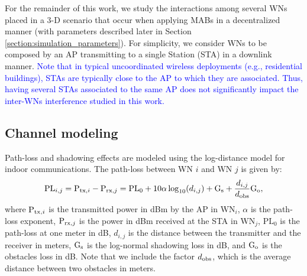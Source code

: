 \documentclass[preprint,12pt]{elsarticle}
\begin{document}
	For the remainder of this work, we study the interactions among several WNs placed in a 3-D scenario that occur when applying MABs in a decentralized manner (with parameters described later in Section \ref{section:simulation_parameters}). For simplicity, we consider WNs to be composed by an AP transmitting to a single Station (STA) in a downlink manner. \textcolor{blue}{Note that in typical uncoordinated wireless deployments (e.g., residential buildings), STAs are typically close to the AP to which they are associated. Thus, having several STAs associated to the same AP does not significantly impact the inter-WNs interference \textcolor{blue}{studied} in this work.}
	
	\subsection{Channel modeling}
	\label{section:channel_modelling}		
	Path-loss and shadowing effects are modeled using the log-distance model for indoor communications. The path-loss between WN $i$ and WN $j$ is given by:	
	\begin{equation}
	\text{PL}_{i,j} = \text{P}_{{\rm tx},i} - \text{P}_{{\rm rx},j} = \text{PL}_0 + 10  \alpha  \log_{10}(d_{i,j}) + \text{G}_{{\rm s}} + \frac{d_{i,j}}{d_{{\rm obs}}} \text{G}_{{\rm o}}, \nonumber
	\nonumber
	\end{equation}
	where $\text{P}_{{\rm tx},i}$ is the transmitted power in dBm by the AP in $\text{WN}_i$, $\alpha$ is the path-loss exponent, $\text{P}_{{\rm rx},j}$ is the power in dBm received at the STA in $\text{WN}_j$, $\text{PL}_0$ is the path-loss at one meter in dB, $d_{i,j}$ is the distance between the transmitter and the receiver in meters, $\text{G}_{{\rm s}}$ is the log-normal shadowing loss in dB, and $\text{G}_{{\rm o}}$ is the obstacles loss in dB. Note that we include the factor $d_{{\rm obs}}$, which is the average distance between two obstacles in meters. 
	
\end{document}
